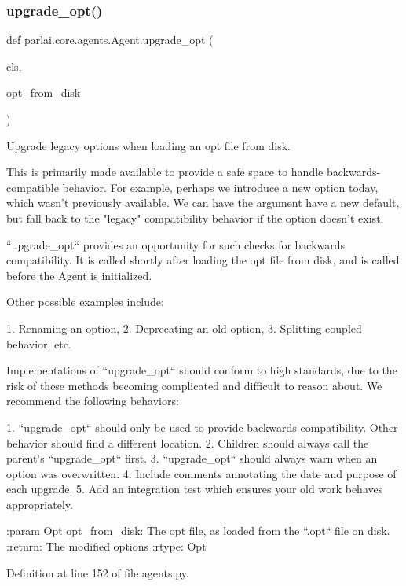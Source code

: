 \subsubsection{\texorpdfstring{upgrade\+\_\+opt()}{upgrade\_opt()}}
{\footnotesize\ttfamily def parlai.\+core.\+agents.\+Agent.\+upgrade\+\_\+opt (\begin{DoxyParamCaption}\item[{}]{cls,  }\item[{}]{opt\+\_\+from\+\_\+disk }\end{DoxyParamCaption})}

\begin{DoxyVerb}Upgrade legacy options when loading an opt file from disk.

This is primarily made available to provide a safe space to handle
backwards-compatible behavior. For example, perhaps we introduce a
new option today, which wasn't previously available. We can have the
argument have a new default, but fall back to the "legacy" compatibility
behavior if the option doesn't exist.

``upgrade_opt`` provides an opportunity for such checks for backwards
compatibility. It is called shortly after loading the opt file from
disk, and is called before the Agent is initialized.

Other possible examples include:

    1. Renaming an option,
    2. Deprecating an old option,
    3. Splitting coupled behavior, etc.

Implementations of ``upgrade_opt`` should conform to high standards,
due to the risk of these methods becoming complicated and difficult to
reason about. We recommend the following behaviors:

    1. ``upgrade_opt`` should only be used to provide backwards
    compatibility.  Other behavior should find a different location.
    2. Children should always call the parent's ``upgrade_opt`` first.
    3. ``upgrade_opt`` should always warn when an option was overwritten.
    4. Include comments annotating the date and purpose of each upgrade.
    5. Add an integration test which ensures your old work behaves
    appropriately.

:param Opt opt_from_disk:
    The opt file, as loaded from the ``.opt`` file on disk.
:return:
    The modified options
:rtype:
    Opt
\end{DoxyVerb}
 

Definition at line 152 of file agents.\+py.


